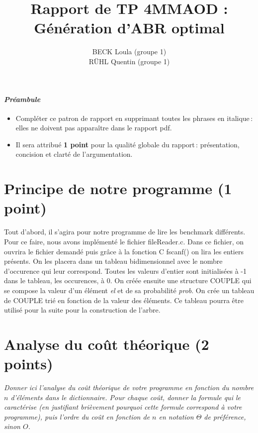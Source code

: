 \documentclass[a4paper, 10pt, french]{article}
\title{Rapport de TP 4MMAOD : Génération d'ABR optimal}
\author{
BECK Loula (groupe 1) 
\\ RÜHL Quentin (groupe 1) 
}
\begin{document}
\maketitle

\paragraph{\em Préambule}
{\em \begin{itemize} 
   \item Compléter ce patron de rapport en supprimant toutes les phrases en italique\,: elles ne doivent pas apparaître dans le rapport pdf.
   \item Il sera attribué {\bf 1 point} pour la qualité globale du rapport\,: présentation, concision et clarté de l'argumentation.
\end{itemize}
}

\section{Principe de notre  programme (1 point)}
 Tout d'abord, il s'agira pour notre programme de lire les benchmark différents. Pour ce faire, nous avons implémenté le fichier {fileReader.c}.
 Dans ce fichier, on ouvrira le fichier demandé puis grâce à la fonction C fscanf() on lira les entiers présents. On les placera 
 dans un tableau bidimensionnel avec le nombre d'occurence qui leur correspond. Toutes les valeurs d'entier sont initialisées à -1 dans le tableau, les occurences, à 0.
 On créée ensuite une structure COUPLE qui se compose la valeur d'un élément {\em el} et de sa probabilité {\em prob}.
 On crée un tableau de COUPLE trié en fonction de la valeur des éléments. Ce tableau pourra être utilisé pour la suite pour la construction de l'arbre.

\section{Analyse du coût théorique (2 points)}
{\em Donner ici l'analyse du coût théorique de votre programme en fonction du nombre $n$ d'éléments dans le dictionnaire.
 Pour chaque coût, donner la formule qui le caractérise (en justifiant brièvement pourquoi cette formule correspond à votre programme), 
 puis l'ordre du coût en fonction de $n$ en notation $\Theta$ de préférence, sinon $O$.}
\end{document}
